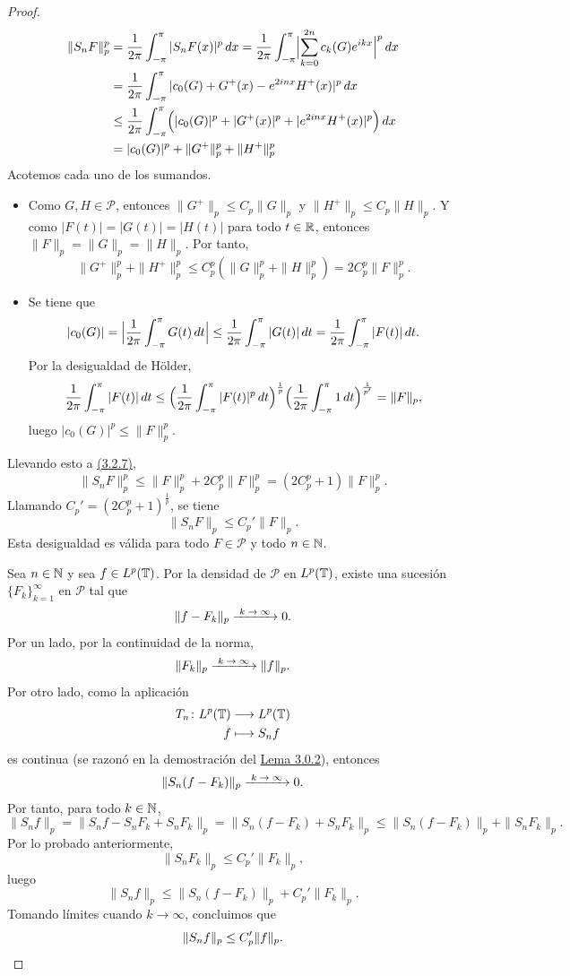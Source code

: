 \documentclass[a4paper, 12pt, oneside]{book}
\begin{document}
\begin{proof}
    \begin{equation}\label{3.2.7}
    \begin{aligned}[b]
        \|S_nF\|_p^p &= \frac{1}{2\pi}\integral[x]{-\pi}{\pi}{|S_nF(x)|^p} = \frac{1}{2\pi}\integral[x]{-\pi}{\pi}{\Bigl|\sum_{k=0}^{2n}c_k(G)e^{ikx}\Bigr|^p} \\ 
        &=\frac{1}{2\pi}\integral[x]{-\pi}{\pi}{|c_0(G)+G^+(x)-e^{2inx}H^+(x)|^p} \\
        &\leq \frac{1}{2\pi}\integral[x]{-\pi}{\pi}{\Bigl(|c_0(G)|^p+|G^+(x)|^p+|e^{2inx}H^+(x)|^p\Bigr)} \\
        &= |c_0(G)|^p + \|G^+\|_p^p + \|H^+\|_p^p
    \end{aligned}
    \end{equation}
    Acotemos cada uno de los sumandos.
    \begin{itemize}
        \item Como $G,H \in \mathcal{P}$, entonces $\|G^+\|_p \leq C_p \|G\|_p$ y $\|H^+\|_p \leq C_p\|H\|_p$. Y como $|F(t)| = |G(t)| = |H(t)|$ para todo $t \in \R$, entonces $\|F\|_p=\|G\|_p=\|H\|_p$. Por tanto,
        \[\|G^+\|_p^p + \|H^+\|_p^p \leq C_p^p(\|G\|_p^p+\|H\|_p^p) = 2C_p^p\|F\|_p^p.\]
        \item Se tiene que
        \[|c_0(G)| = \Bigl|\frac{1}{2\pi}\integral{-\pi}{\pi}{G(t)}\Bigr| \leq \frac{1}{2\pi}\integral{-\pi}{\pi}{|G(t)|} = \frac{1}{2\pi}\integral{-\pi}{\pi}{|F(t)|}.\]
        Por la desigualdad de Hölder,
        \[\frac{1}{2\pi}\integral{-\pi}{\pi}{|F(t)|} \leq \Bigl(\frac{1}{2\pi}\integral{-\pi}{\pi}{|F(t)|^p}\Bigr)^{\frac{1}{p}}\Bigl(\frac{1}{2\pi}\integral{-\pi}{\pi}{1}\Bigr)^{\frac{1}{p'}} = \|F\|_p,\]
        luego $|c_0(G)|^p \leq \|F\|_p^p$.
    \end{itemize}
    Llevando esto a \hyperref[3.2.7]{\color{blue}(3.2.7)},
    \[\|S_nF\|_p^p \leq \|F\|_p^p + 2C_p^p\|F\|_p^p = (2C_p^p+1)\|F\|_p^p.\]
    Llamando $C_p' = (2C_p^p+1)^{\frac{1}{p}}$, se tiene
    \[\|S_nF\|_p \leq C_p'\|F\|_p.\]
    Esta desigualdad es válida para todo $F \in \mathcal{P}$ y todo $n \in \N$.

    Sea $n \in \N$ y sea $f \in L^p(\T)$. Por la densidad de $\mathcal{P}$ en $L^p(\T)$, existe una sucesión $\{F_k\}_{k=1}^\infty$ en $\mathcal{P}$ tal que
    \[\|f-F_k\|_p \kconv 0.\]
    Por un lado, por la continuidad de la norma,
    \[\|F_k\|_p \kconv \|f\|_p.\]
    Por otro lado, como la aplicación
    \begin{align*}
        T_n \colon L^p(\T) &\longrightarrow L^p(\T) \\
        f &\longmapsto S_nf
    \end{align*}
    es continua (se razonó en la demostración del \hyperref[3.0.2]{\color{blue}Lema 3.0.2}), entonces 
    \[\|S_n(f-F_k)\|_p \kconv 0.\]
    Por tanto, para todo $k \in \N$,
    \[\|S_nf\|_p = \|S_nf-S_nF_k+S_nF_k\|_p = \|S_n(f-F_k)+S_nF_k\|_p  \leq \|S_n(f-F_k)\|_p + \|S_nF_k\|_p.\]
    Por lo probado anteriormente,
    \[\|S_nF_k\|_p \leq C_p'\|F_k\|_p,\]
    luego
    \[\|S_nf\|_p  \leq \|S_n(f-F_k)\|_p + C_p'\|F_k\|_p.\]
    Tomando límites cuando $k \to\infty$, concluimos que
    \[\|S_nf\|_p \leq C_p'\|f\|_p. \qedhere\]
\end{proof}
\end{document}
